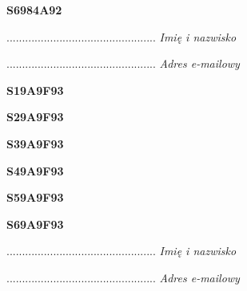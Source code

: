 \begin{turn}{90}\huge \textbf{S6984A92}\end{turn}

\begin{turn}{90}\begin{minipage}{\linewidth} \vspace{20mm} ................................................  \textit{Imię i nazwisko}\end{minipage}\end{turn}

\begin{turn}{90}\begin{minipage}{\linewidth} \vspace{20mm} ................................................  \textit{Adres e-mailowy}\end{minipage}\end{turn}

\begin{turn}{90}\huge \textbf{S19A9F93}\end{turn}

\begin{turn}{90}\huge \textbf{S29A9F93}\end{turn}

\begin{turn}{90}\huge \textbf{S39A9F93}\end{turn}

\begin{turn}{90}\huge \textbf{S49A9F93}\end{turn}

\begin{turn}{90}\huge \textbf{S59A9F93}\end{turn}

\begin{turn}{90}\huge \textbf{S69A9F93}\end{turn}

\begin{turn}{90}\begin{minipage}{\linewidth} \vspace{20mm} ................................................  \textit{Imię i nazwisko}\end{minipage}\end{turn}

\begin{turn}{90}\begin{minipage}{\linewidth} \vspace{20mm} ................................................  \textit{Adres e-mailowy}\end{minipage}\end{turn}

